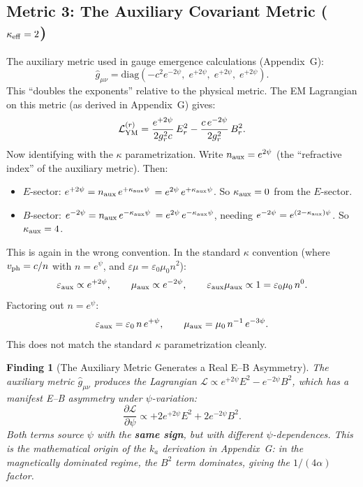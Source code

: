 \documentclass[11pt,a4paper]{article}
\newtheorem{finding}{Finding}
\theoremstyle{definition}
\theoremstyle{remark}
\begin{document}
\subsection{Metric 3: The Auxiliary Covariant Metric ($\kappa_{\rm eff} = 2$)}

The auxiliary metric used in gauge emergence calculations (Appendix~G):
\begin{equation}\label{eq:auxiliary}
\hat{g}_{\mu\nu} = \mathrm{diag}(-c^2 e^{-2\psi},\;
e^{+2\psi},\; e^{+2\psi},\; e^{+2\psi}).
\end{equation}
This ``doubles the exponents'' relative to the physical metric.  The
EM Lagrangian on this metric (as derived in Appendix~G) gives:
\begin{equation}\label{eq:LEM-aux}
\mathcal{L}_{\rm YM}^{(r)} = \frac{e^{+2\psi}}{2g_r^2 c}\,E_r^2
- \frac{c\,e^{-2\psi}}{2g_r^2}\,B_r^2.
\end{equation}
Now identifying with the $\kappa$ parametrization.  Write
$n_{\rm aux} = e^{2\psi}$ (the ``refractive index'' of the auxiliary
metric).  Then:
\begin{itemize}
\item $E$-sector: $e^{+2\psi} = n_{\rm aux}\,e^{+\kappa_{\rm aux}\psi}$
  $= e^{2\psi}\,e^{+\kappa_{\rm aux}\psi}$.
  So $\kappa_{\rm aux} = 0$ from the $E$-sector.
\item $B$-sector: $e^{-2\psi} = n_{\rm aux}\,e^{-\kappa_{\rm aux}\psi}$
  $= e^{2\psi}\,e^{-\kappa_{\rm aux}\psi}$, needing $e^{-2\psi} = e^{(2-\kappa_{\rm aux})\psi}$.
  So $\kappa_{\rm aux} = 4$.
\end{itemize}

This is again in the wrong convention.  In the standard $\kappa$ convention
(where $v_{\rm ph} = c/n$ with $n = e^\psi$, and
$\varepsilon\mu = \varepsilon_0\mu_0 n^2$):
\begin{equation}
\varepsilon_{\rm aux} \propto e^{+2\psi}, \qquad
\mu_{\rm aux} \propto e^{-2\psi}, \qquad
\varepsilon_{\rm aux}\mu_{\rm aux} \propto 1 = \varepsilon_0\mu_0\,n^0.
\end{equation}
Factoring out $n = e^\psi$:
\begin{equation}
\varepsilon_{\rm aux} = \varepsilon_0\,n\,e^{+\psi},
\qquad
\mu_{\rm aux} = \mu_0\,n^{-1}\,e^{-3\psi}.
\end{equation}
This does not match the standard $\kappa$ parametrization cleanly.

\begin{finding}[The Auxiliary Metric Generates a Real E--B Asymmetry]
The auxiliary metric $\hat{g}_{\mu\nu}$ produces the Lagrangian
$\mathcal{L} \propto e^{+2\psi}E^2 - e^{-2\psi}B^2$, which has a
manifest E--B asymmetry under $\psi$-variation:
\begin{equation}
\frac{\partial\mathcal{L}}{\partial\psi}
\propto +2 e^{+2\psi} E^2 + 2 e^{-2\psi} B^2.
\end{equation}
Both terms source $\psi$ with the \textbf{same sign}, but with different
$\psi$-dependences.  This is the mathematical origin of the $k_a$
derivation in Appendix~G: in the magnetically dominated regime, the
$B^2$ term dominates, giving the $1/(4\alpha)$ factor.
\end{finding}
\end{document}
